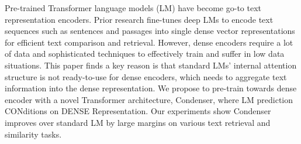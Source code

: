 Pre-trained Transformer language models (LM) have become go-to text representation encoders. Prior research fine-tunes deep LMs to encode text sequences such as sentences and passages into single dense vector representations for efficient text comparison and retrieval. However, dense encoders require a lot of data and sophisticated techniques to effectively train and suffer in low data situations. This paper finds a key reason is that standard LMs' internal attention structure is not ready-to-use for dense encoders, which needs to aggregate text information into the dense representation. We propose to pre-train towards dense encoder with a novel Transformer architecture, Condenser, where LM prediction CONditions on DENSE Representation. Our experiments show Condenser improves over standard LM by large margins on various text retrieval and similarity tasks.
